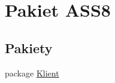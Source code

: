 \hypertarget{a00059}{
\section{Pakiet ASS8}
\label{d3/d8b/a00059}
}
\subsection*{Pakiety}
\begin{CompactItemize}
\item 
package \hyperlink{a00060}{Klient}
\end{CompactItemize}
